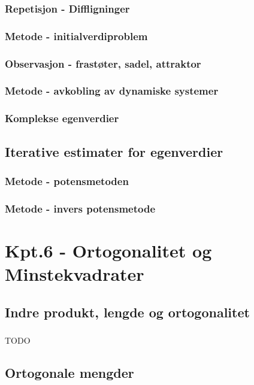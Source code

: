 \documentclass{article}
\begin{document}
      \subsubsection{Repetisjon - Diffligninger}
        
      \subsubsection{Metode - initialverdiproblem}
        
      \subsubsection{Observasjon - frastøter, sadel, attraktor}
        
      \subsubsection{Metode - avkobling av dynamiske systemer}
        
      \subsubsection{Komplekse egenverdier}
        
    \subsection{Iterative estimater for egenverdier}
      \subsubsection{Metode - potensmetoden}
        
      \subsubsection{Metode - invers potensmetode}
        
  \section{Kpt.6 - Ortogonalitet og Minstekvadrater}
    \subsection{Indre produkt, lengde og ortogonalitet}
      \subsubsection{}
        TODO
    \subsection{Ortogonale mengder}
\end{document}
